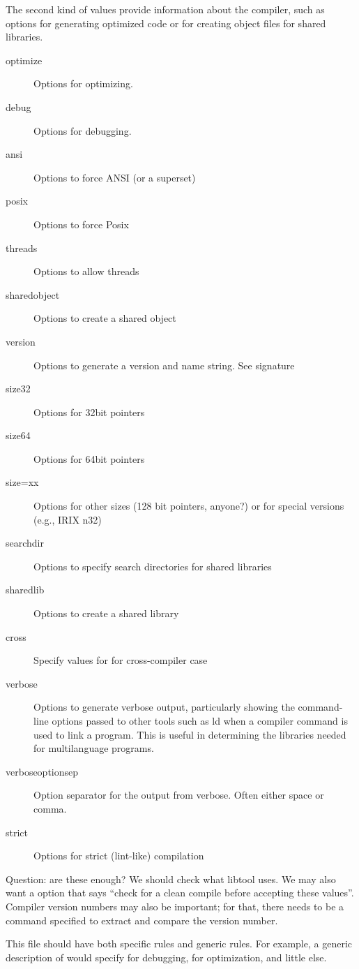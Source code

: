 \documentclass{article}
\begin{document}
The second kind of values provide information about the compiler, such as
options for generating optimized code or for creating object files for shared libraries.
\begin{description}
\item[optimize]Options for optimizing.
\item[debug]Options for debugging.
\item[ansi]Options to force ANSI (or a superset)
\item[posix]Options to force Posix
\item[threads]Options to allow threads
\item[sharedobject]Options to create a shared object
\item[version]Options to generate a version and name string.  See signature
\item[size32]Options for 32bit pointers
\item[size64]Options for 64bit pointers
\item[size=xx]Options for other sizes (128 bit pointers, anyone?) or
for special versions (e.g., IRIX n32)
\item[searchdir]Options to specify search directories for shared
libraries
\item[sharedlib]Options to create a shared library
\item[cross]Specify values for  for cross-compiler case
\item[verbose]Options to generate verbose output, particularly showing
the command-line options passed to other tools such as ld when a
compiler command is used to link a program.  This is useful in
determining the libraries needed for multilanguage programs.
\item[verboseoptionsep]Option separator for the output from verbose.
Often either space or comma.
\item[strict]Options for strict (lint-like) compilation
\end{description}
Question: are these enough?  We should check what libtool uses.
We may also want a option that says ``check for a clean compile before
accepting these values''.  Compiler version numbers may also be
important; for that, there needs to be a command specified to extract and
compare the version number.

This file should have both specific rules and generic rules.  For
example, a generic description of  would specify 
for debugging,  for optimization, and little else.  
\end{document}
